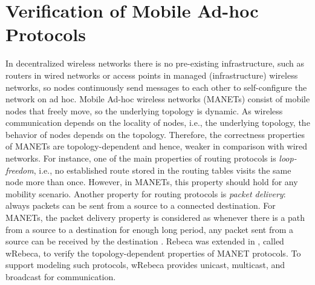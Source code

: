 \section{Verification of Mobile Ad-hoc Protocols}\label{sec::wrebeca} 
In decentralized wireless networks there is no pre-existing infrastructure, such as routers in wired networks or access points in managed (infrastructure) wireless networks, so nodes continuously send messages to each other to self-configure the network on ad hoc. %
Mobile Ad-hoc wireless networks (MANETs) consist of mobile nodes that freely move, so the underlying topology is dynamic. As wireless communication depends on the locality of nodes, i.e., the underlying topology, the behavior of nodes depends on the topology. Therefore, the correctness properties of MANETs are topology-dependent and hence, weaker in comparison with wired networks. For instance, one of the main properties of routing protocols is \emph{loop-freedom}, i.e., no established route stored in the routing tables visits the same node more than once. However, in MANETs, this property should hold for any mobility scenario. Another property for routing protocols is \emph{packet delivery}: always packets can be sent from a source to a connected destination. For MANETs, the packet delivery property is considered as whenever there is a path from a source to a destination for enough long period, any packet sent from a source can be received by the destination \cite{GlabbeekAWN}. Rebeca was extended in \cite{FOAC}, called wRebeca, to verify the topology-dependent properties of MANET protocols. To support modeling such protocols, wRebeca provides unicast, multicast, and broadcast for communication. %
